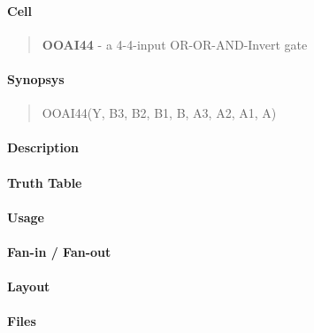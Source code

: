 \label{OOAI44}
\paragraph{Cell}
\begin{quote}
    \textbf{OOAI44} - a 4-4-input OR-OR-AND-Invert gate
\end{quote}

\paragraph{Synopsys}
\begin{quote}
    OOAI44(Y, B3, B2, B1, B, A3, A2, A1, A)
\end{quote}

\paragraph{Description}

%

\paragraph{Truth Table}
%

\paragraph{Usage}

\paragraph{Fan-in / Fan-out}

\paragraph{Layout}

\paragraph{Files}
